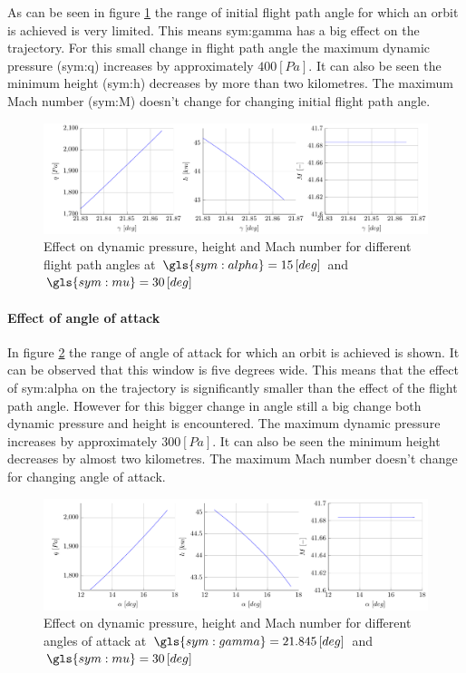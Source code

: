 As can be seen in figure \ref{fig:effectgamma} the range of initial flight path angle for which an orbit is achieved is very limited. This means \gls{sym:gamma} has a big effect on the trajectory. For this small change in flight path angle the maximum dynamic pressure (\gls{sym:q}) increases by approximately $400 \left[Pa\right]$. It can also be seen the minimum height (\gls{sym:h}) decreases by more than two kilometres. The maximum Mach number (\gls{sym:M}) doesn't change for changing initial flight path angle.
\begin{figure}[h]
	\centering
	\includegraphics[width=\textwidth]{./Figure/orbit/effectgamma.pdf}
	\caption[Effect on dynamic pressure, height and Mach number for different flight path angles]{Effect on dynamic pressure, height and Mach number for different flight path angles at $\gls{sym:alpha}=15 \left[deg\right]$ and $\gls{sym:mu}=30 \left[deg\right]$}
	\label{fig:effectgamma}
\end{figure}

\paragraph{Effect of angle of attack}

In figure \ref{fig:effectalpha} the range of angle of attack for which an orbit is achieved is shown. It can be observed that this window is five degrees wide. This means that the effect of \gls{sym:alpha} on the trajectory is significantly smaller than the effect of the flight path angle. However for this bigger change in angle still a big change both dynamic pressure and height is encountered. The maximum dynamic pressure increases by approximately $300 \left[Pa\right]$. It can also be seen the minimum height decreases by almost two kilometres. The maximum Mach number doesn't change for changing angle of attack.
\begin{figure}[h]
	\centering
	\includegraphics[width=\textwidth]{./Figure/orbit/effectalpha.pdf}
	\caption{Effect on dynamic pressure, height and Mach number for different angles of attack at $\gls{sym:gamma}=21.845 \left[deg\right]$ and $\gls{sym:mu}=30 \left[deg\right]$}
	\label{fig:effectalpha}
\end{figure}

